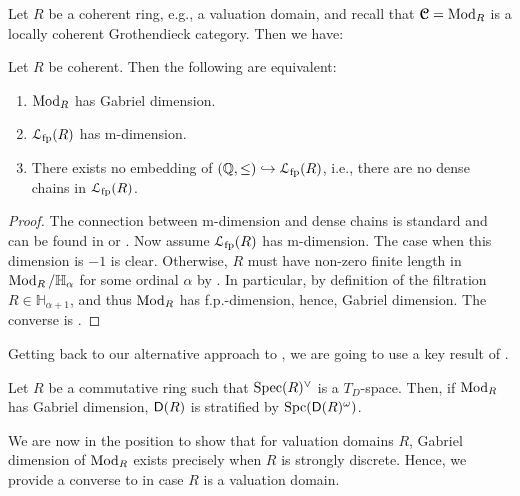 \documentclass[reqno,a4paper]{amsart}
\begin{document}
Let $R$ be a coherent ring, e.g., a valuation domain, and recall that $\operatorname{\boldsymbol{\mathcal{C}}}=\operatorname{Mod}_R$ is a locally coherent Grothendieck category. Then we have:

\begin{corollary}\label{prop:kgforcoherentrings}
    Let $R$ be coherent. Then the following are equivalent:
    \begin{enumerate}
        \item $\operatorname{Mod}_R$ has Gabriel dimension.
        \item $\mathcal{L}_{\mathrm{fp}}(R)$ has m-dimension.
        \item There exists no embedding of $(\mathbb{Q},\le)\hookrightarrow\mathcal{L}_{\mathrm{fp}}(R)$, i.e., there are no dense chains in $\mathcal{L}_{\mathrm{fp}}(R)$.
    \end{enumerate}
\end{corollary}
\begin{proof}
    The connection between m-dimension and dense chains is standard and can be found in \cite[Proposition 7.2.3]{pp} or \cite[Lemma 14.1.11]{kra22}. Now assume $\mathcal{L}_{\mathrm{fp}}(R)$ has m-dimension. The case when this dimension is $-1$ is clear. Otherwise, $R$ must have non-zero finite length in $\operatorname{Mod}_R/\mathbb{H}_{\alpha}$ for some ordinal $\alpha$ by \cite[Theorem 4.5]{bur01}. In particular, by definition of the filtration $R\in\mathbb{H}_{\alpha+1}$, and thus $\operatorname{Mod}_R$ has f.p.-dimension, hence, Gabriel dimension. The converse is .
\end{proof}

Getting back to our alternative approach to , we are going to use a key result of \cite{isolated}.

\begin{theorem}\label{thm:kgimpliesstratification}
    Let $R$ be a commutative ring such that $\operatorname{Spec}(R)^\vee$ is a $T_D$-space. Then, if $\operatorname{Mod}_R$ has Gabriel dimension, $\mathsf{D}(R)$ is stratified by $\operatorname{Spc}(\mathsf{D}(R)^\omega)$.
\end{theorem}
We are now in the position to show that for valuation domains $R$, Gabriel dimension of $\operatorname{Mod}_R$ exists precisely when $R$ is strongly discrete. Hence, we provide a converse to  in case $R$ is a valuation domain.
\end{document}
